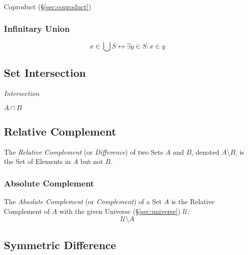 Coproduct (\S\ref{sec:coproduct})



\subsubsection{Infinitary Union}\label{sec:infinitary_union}

\[
  x \in \bigcup S \leftrightarrow \exists y \in S : x \in y
\]



\subsection{Set Intersection}\label{sec:set_intersection}

\emph{Intersection}

$A \cap B$



\subsection{Relative Complement}\label{sec:relative_complement}

The \emph{Relative Complement} (or \emph{Difference}) of two Sets $A$
and $B$, denoted $A \setminus B$, is the Set of Elements in $A$ but
not $B$.



\subsubsection{Absolute Complement}\label{sec:absolute_complement}

The \emph{Absolute Complement} (or \emph{Complement}) of a Set $A$ is
the Relative Complement of $A$ with the given Universe
(\S\ref{sec:universe}) $\mathcal{U}$:
\[
  \mathcal{U} \setminus A
\]



\subsection{Symmetric Difference}\label{sec:symmetric_difference}

